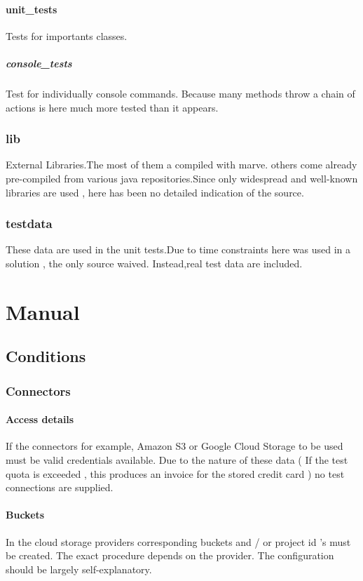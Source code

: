 \documentclass
[   oneside,         %
    12pt,            %
    DIV15,           %
    headsepline,     %
    footsepline,     %
    openright,       %
    a4paper,         %
    abstracton,      %
    titlepage,       %
    headinclude,     %
]   {scrreprt}       %
\begin{document}
	\subsection{unit\_tests}
	Tests for importants classes.
	\subsubsection{console\_tests}
	Test for individually console commands. Because many methods throw a chain of actions is here much more tested than it appears.
	\section{lib}
	External Libraries.The most of them a compiled with marve. others come already pre-compiled from various java repositories.Since only widespread and well-known libraries are used , here has been no detailed indication of the source.
	\section{testdata}
	These data are used in the unit tests.Due to time constraints here was used in a solution , the only source waived. Instead,real test data are included.
        \part{Manual}
	\chapter{Conditions}
	\section{Connectors}
	\subsection{Access details}
If the connectors for example, Amazon S3 or Google Cloud Storage to be used must be valid credentials available. Due to the nature of these data ( If the test quota is exceeded , this produces an invoice for the stored credit card ) no test connections are supplied.
	\subsection{Buckets}
In the cloud storage providers corresponding buckets and / or project id 's must be created. The exact procedure depends on the provider. The configuration should be largely self-explanatory.
\end{document}
